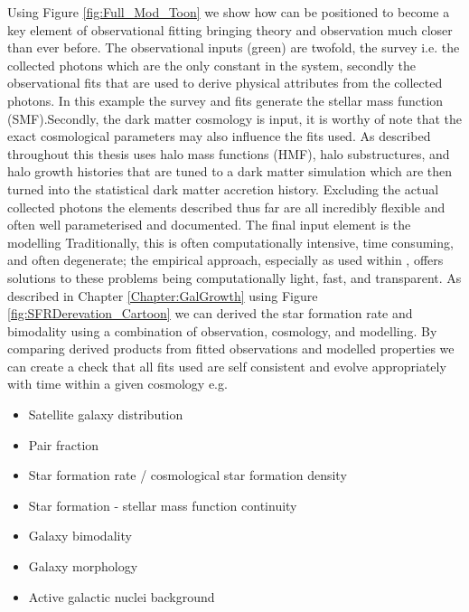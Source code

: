 Using Figure \ref{fig:Full_Mod_Toon} we show how \steel can be positioned to become a key element of observational fitting bringing theory and observation much closer than ever before. \textcolor{MPLgreen}{The observational inputs (green) are twofold, the survey i.e. the collected photons which are the only constant in the system, secondly the observational fits that are used to derive physical attributes from the collected photons. In this example the survey and fits generate the stellar mass function (SMF).}\textcolor{MPLred}{Secondly, the dark matter cosmology is input, it is worthy of note that the exact cosmological parameters may also influence the fits used. As described throughout this thesis \steel uses halo mass functions (HMF), halo substructures, and halo growth histories that are tuned to a dark matter simulation which are then turned into the statistical dark matter accretion history.} Excluding the actual collected photons the elements described thus far are all incredibly flexible and often well parameterised and documented. \textcolor{MPLblue}{The final input element is the modelling Traditionally, this is often computationally intensive, time consuming, and often degenerate; the empirical approach, especially as used within \steel, offers solutions to these problems being computationally light, fast, and transparent.} As described in Chapter \ref{Chapter:GalGrowth} using Figure \ref{fig:SFRDerevation_Cartoon} we can derived the star formation rate and bimodality using a combination of \textcolor{MPLgreen}{observation}, \textcolor{MPLred}{cosmology}, and \textcolor{MPLblue}{modelling}. By comparing derived products from fitted observations and modelled properties we can create a check that all fits used are self consistent and evolve appropriately with time within a given cosmology e.g.
\begin{itemize}
    \item Satellite galaxy distribution
    \item Pair fraction
    \item Star formation rate / cosmological star formation density
    \item Star formation - stellar mass function continuity
    \item Galaxy bimodality
    \item Galaxy morphology
    \item Active galactic nuclei background 
\end{itemize}

